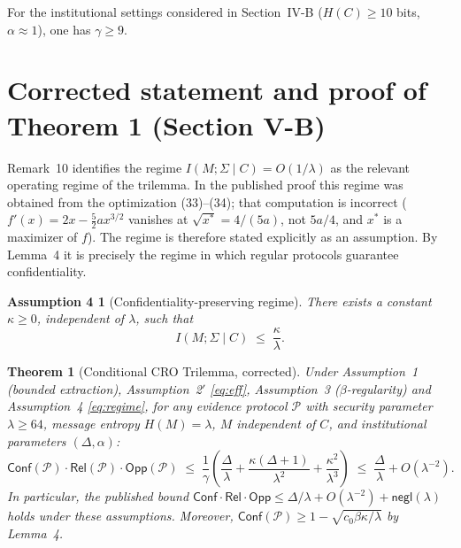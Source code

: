 \documentclass[10pt,a4paper]{article}
\newtheorem{theorem}{Theorem}
\newtheorem*{assumptionD}{Assumption 4}
\theoremstyle{remark}
\newcommand{\Conf}{\mathsf{Conf}}
\newcommand{\Rel}{\mathsf{Rel}}
\newcommand{\Opp}{\mathsf{Opp}}
\newcommand{\negl}{\mathsf{negl}}
\newcommand{\cP}{\mathcal{P}}
\newcommand{\IMS}{I(M;\Sigma\mid C)}
\begin{document}
\noindent For the institutional settings considered in Section~IV-B
($H(C)\ge 10$ bits, $\alpha\approx 1$), one has $\gamma\ge 9$.

\section{Corrected statement and proof of Theorem 1 (Section V-B)}

Remark~10 identifies the regime $\IMS=O(1/\lambda)$ as the relevant operating
regime of the trilemma. In the published proof this regime was obtained
from the optimization (33)--(34); that computation is incorrect
($f'(x)=2x-\tfrac52 a x^{3/2}$ vanishes at $\sqrt{x^*}=4/(5a)$, not $5a/4$,
and $x^*$ is a maximizer of $f$). The regime is therefore stated explicitly
as an assumption. By Lemma~4 it is precisely the regime in which regular
protocols guarantee confidentiality.

\begin{assumptionD}[Confidentiality-preserving regime]
There exists a constant $\kappa\ge 0$, independent of $\lambda$, such that
\begin{equation*}\tag{12$'$}\label{eq:regime}
\IMS\;\le\;\frac{\kappa}{\lambda}.
\end{equation*}
\end{assumptionD}

\begin{theorem}[Conditional CRO Trilemma, corrected]
Under Assumption~1 (bounded extraction), Assumption~2$'$ \eqref{eq:eff}, Assumption~3 ($\beta$-regularity) and
Assumption~4 \eqref{eq:regime}, for any evidence protocol $\cP$ with
security parameter $\lambda\ge 64$, message entropy $H(M)=\lambda$,
$M$ independent of $C$, and institutional parameters $(\Delta,\alpha)$:
\begin{equation*}\tag{23$'$}\label{eq:main}
\Conf(\cP)\cdot\Rel(\cP)\cdot\Opp(\cP)
\;\le\;\frac{1}{\gamma}\left(\frac{\Delta}{\lambda}
+\frac{\kappa(\Delta+1)}{\lambda^{2}}+\frac{\kappa^{2}}{\lambda^{3}}\right)
\;\le\;\frac{\Delta}{\lambda}+O(\lambda^{-2}).
\end{equation*}
In particular, the published bound
$\Conf\cdot\Rel\cdot\Opp\le\Delta/\lambda+O(\lambda^{-2})+\negl(\lambda)$
holds under these assumptions. Moreover, $\Conf(\cP)\ge
1-\sqrt{c_0\beta\kappa/\lambda}$ by Lemma~4.
\end{theorem}
\end{document}
